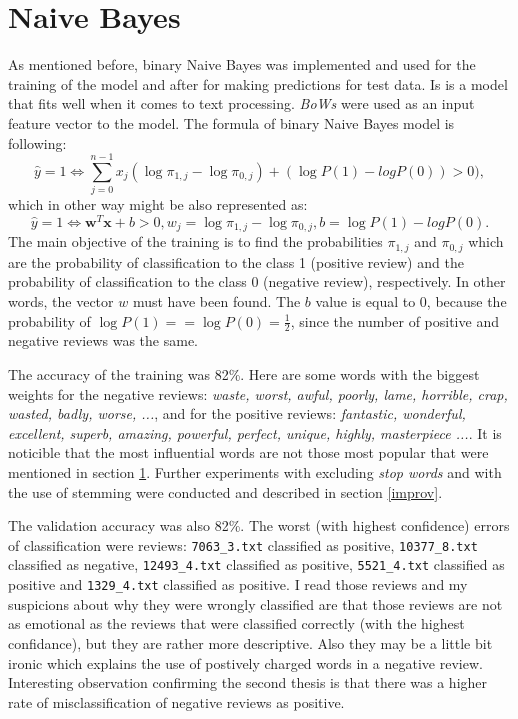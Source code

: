 \documentclass{article}
\begin{document}
\section{Naive Bayes}
\label{nb}
As mentioned before, binary Naive Bayes was implemented and used for the training of the model and after for making predictions for test data. Is is a model that fits well when it comes to text processing. \textit{BoWs} were used as an input feature vector to the model. The formula of binary Naive Bayes model is following:
\begin{equation}
    \hat{y} = 1 \iff \sum^{n - 1}_{j = 0}x_j(\log\pi_{1, j} - \log\pi_{0, j}) + (\log{P(1)} - log{P(0)}) > 0),
\end{equation}
which in other way might be also represented as:
\begin{equation}
    \hat{y} = 1 \iff \boldsymbol{w}^T\boldsymbol{x} + b > 0, w_j = \log\pi_{1, j} - \log\pi_{0, j}, b = \log{P(1)} - log{P(0)}.
\end{equation}
The main objective of the training is to find the probabilities $\pi_{1,j}$ and $\pi_{0,j}$ which are the probability of classification to the class 1 (positive review) and the probability of classification to the class 0 (negative review), respectively.  In other words, the vector $w$ must have been found. The $b$ value is equal to $0$, because the probability of $\log{P(1)} == \log{P(0) = \frac{1}{2}}$, since the number of positive and negative reviews was the same.

The accuracy of the training was 82\%. Here are some words with the biggest weights for the negative reviews: \textit{waste, worst, awful, poorly, lame, horrible, crap, wasted, badly, worse, ...}, and for the positive reviews: \textit{fantastic, wonderful, excellent, superb, amazing, powerful, perfect, unique, highly, masterpiece ...}. It is noticible that the most influential words are not those most popular that were mentioned in section \ref{nb}. Further experiments with excluding \textit{stop words} and with the use of stemming were conducted and described in section \ref{improv}.

The validation accuracy was  also 82\%. The worst (with highest confidence) errors of classification were reviews: \texttt{7063\_3.txt} classified as positive, \texttt{10377\_8.txt} classified as negative, \texttt{12493\_4.txt} classified as positive, \texttt{5521\_4.txt} classified as positive and \texttt{1329\_4.txt} classified as positive. I read those reviews and my suspicions about why they were wrongly classified are that those reviews are not as emotional as the reviews that were classified correctly (with the highest confidance), but they are rather more descriptive. Also they may be a little bit ironic which explains the use of postively charged words in a negative review. Interesting observation confirming the second thesis is that there was a higher rate of misclassification of negative reviews as positive.
\end{document}
